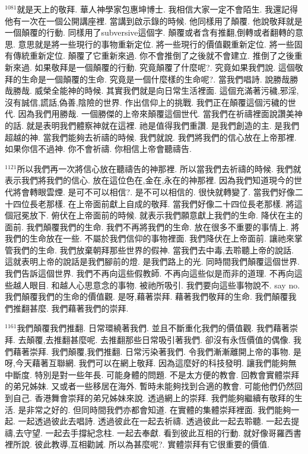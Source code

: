\documentclass{book}
\begin{document}
$^{1081}$就是天上的敬拜.
華人神學家包惠坤博士.
我相信大家一定不會陌生.
我還記得他有一次在一個公開講座裡.
當講到啟示錄的時候.
他同樣用了顛覆.
他說敬拜就是一個顛覆的行動.
同樣用了subversive這個字.
顛覆或者含有推翻,倒轉或者翻轉的意思.
意思就是將一些現行的事物重新定位.
將一些現行的價值觀重新定位.
將一些固有傳統重新定位.
顛覆了它重新來過.
你不會推倒了之後就不會建立.
推倒了之後重新來過.
如果敬拜是一個顛覆的行動.
究竟顛覆了什麼呢?.
究竟如果我們說.
這個敬拜的生命是一個顛覆的生命.
究竟是一個什麼樣的生命呢?.
當我們唱詩.
說勝哉勝哉勝哉.
威榮全能神的時候.
其實我們就是向日常生活裡面.
這個充滿著污穢,邪淫,沒有誠信,謊話,偽善,陰險的世界.
作出信仰上的挑戰.
我們正在顛覆這個污穢的世代.
因為我們用勝哉.
一個勝傑的上帝來顛覆這個世代.
當我們在祈禱裡面說讚美神的話.
就是表明我們體察神就在這裡.
祂是值得我們重讚.
是我們創造的主.
是我們超越的神.
當我們能夠去祈禱的時候.
我們就說.
我們將我們的信心放在上帝那裡.
如果你信不過神.
你不會祈禱.
你相信上帝會聽禱告.

$^{1121}$所以我們再一次將信心放在聽禱告的神那裡.
所以當我們去祈禱的時候.
我們就表示我們將我們的信心.
放在這位色在,金在,永在的神那裡.
因為我們知道現今的世代將會轉眼雲煙.
是可不可以相信?.
是不可以相信的.
很快就轉變了.
當我們好像二十四位長老那樣.
在上帝面前獻上自成的敬拜.
當我們好像二十四位長老那樣.
將這個冠冕放下.
俯伏在上帝面前的時候.
就表示我們願意獻上我們的生命.
降伏在主的面前.
我們顛覆我們的生命.
我們不再將我們的生命.
放在很多不重要的事情上.
將我們的生命放在一些.
不屬於我們信仰的事物裡面.
我們降伏在上帝面前.
讓祂來掌管我們的生命.
我們放棄朝拜那些世界的假神.
當我們去中毒,去聆聽上帝的說話.
這就表明上帝的說話是我們腳前的燈.
是我們路上的光.
同時間我們顛覆這個世界.
我們告訴這個世界.
我們不再向這些假教師.
不再向這些似是而非的道理.
不再向這些越人眼目.
和越人心思意念的事物.
被祂所吸引.
我們要向這些事物說不.
say no.
我們顛覆我們的生命的價值觀.
是呀,藉著崇拜.
藉著我們敬拜的生命.
我們顛覆我們推翻甚麼.
我們藉著我們的崇拜.

$^{1161}$我們顛覆我們推翻.
日常環繞著我們.
並且不斷重化我們的價值觀.
我們藉著崇拜.
去顛覆,去推翻甚麼呢.
去推翻那些日常吸引著我們.
卻沒有永恆價值的偶像.
我們藉著崇拜.
我們顛覆,我們推翻.
日常污染著我們.
令我們漸漸離開上帝的事物.
是呀,今天藉著互聯網.
我們可以在網上敬拜.
因為這麼好的科技發明.
讓我們能夠無中斷度.
特別是對一些年長.
可能身體的問題.
不是太方便的教會.
回教會實體崇拜的弟兄姊妹.
又或者一些移居在海外.
暫時未能夠找到合適的教會.
可能他們仍然回到自己.
香港舞會崇拜的弟兄姊妹來說.
透過網上的崇拜.
我們能夠繼續有敬拜的生活.
是非常之好的.
但同時間我們亦都會知道.
在實體的集體崇拜裡面.
我們能夠一起.
一起透過彼此去唱詩.
透過彼此在一起去祈禱.
透過彼此一起去聆聽.
一起去提禱,去守望.
一起去手撐紀念柱.
一起去奉獻.
看到彼此互相的行動.
就好像哥羅西書裡所說.
彼此教導,互相勸誡.
所以為甚麼呢?.
實體崇拜有它很重要的價值.
\end{document}
